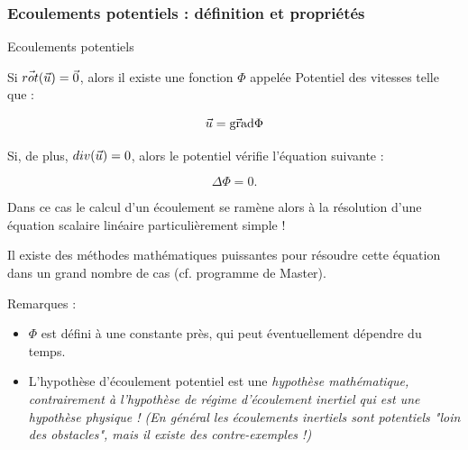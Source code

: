 \subsubsection{Ecoulements potentiels : définition et propriétés}
\begin{frame}{Ecoulements potentiels} \hypertarget{frame:toto}{}

\small



\vspace{0mm}

Si $\vec{rot}(\vec{u}) = \vec{0}$, alors il existe une fonction 
$\Phi$ appelée {\color{red}Potentiel des vitesses } telle que :

$$
\vec{u} = \vec{\mbox{\rm gra}}\mbox{\rm d}{\Phi}
$$


\pause
Si, de plus, $div(\vec{u}) = 0$, alors le potentiel vérifie l'équation suivante :

$$
\Delta{\Phi} = 0.
$$

Dans ce cas le calcul d'un écoulement se ramène alors à la résolution d'une équation scalaire linéaire particulièrement simple  !

\smallskip

Il existe des méthodes mathématiques puissantes pour résoudre cette équation dans un grand nombre de cas (cf. programme de Master).


\pause 
\medskip
Remarques :

\begin{itemize}
\item
 $\Phi$ est défini à une constante près, qui peut éventuellement dépendre du temps.

\pause 

\item L'hypothèse d'écoulement potentiel est une \em{hypothèse mathématique}, contrairement à l'hypothèse de régime d'écoulement inertiel qui est une hypothèse physique !
 \smallskip 
(En général les écoulements inertiels sont potentiels "loin des obstacles", mais il existe des contre-exemples !) 




\end{itemize}


\end{frame}





